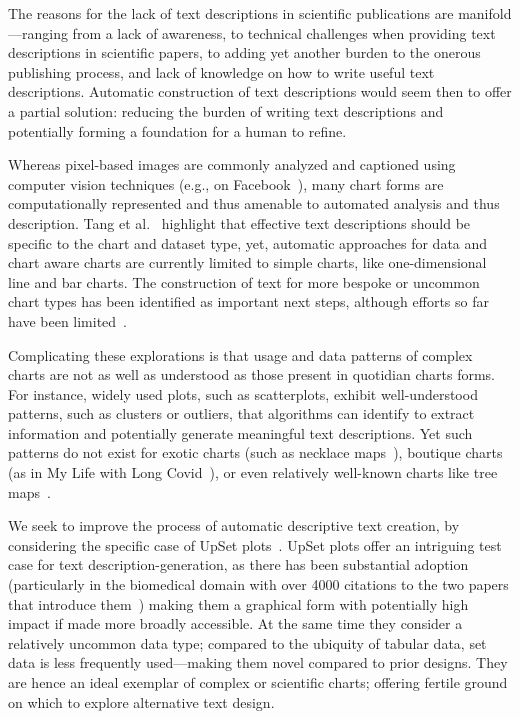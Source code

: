 \documentclass{egpubl}
\newcommand{\etal}{et al.}
\newcommand{\eg}{{e.g.,}}
\begin{document}
The reasons for the lack of text descriptions in scientific publications are manifold---ranging from a lack of awareness, to technical challenges when providing text descriptions in scientific papers, to adding yet another burden to the onerous publishing process, and lack of knowledge on how to write useful text descriptions.
Automatic construction of text descriptions would seem then to offer a partial solution: reducing the burden of writing text descriptions and potentially forming a foundation for a human to refine.

Whereas pixel-based images are commonly analyzed and captioned using computer vision techniques (\eg{} on Facebook~\cite{wu_automatic_2017}), many chart forms are computationally represented and thus amenable to automated analysis and thus description.
Tang \etal{}~\cite{tang_vistext_2023} highlight that effective text descriptions should be specific to the chart and dataset type, yet, automatic approaches for data and chart aware charts are currently limited to simple charts, like one-dimensional line and bar charts. The construction of text for more bespoke or uncommon chart types has been identified as important next steps, although efforts so far have been limited~\cite{kim_explain_2023, li_altgeoviz_2024}.

Complicating these explorations is that usage and data patterns of complex charts are not as well as understood as those present in quotidian charts forms.
For instance, widely used plots, such as scatterplots, exhibit well-understood patterns, such as clusters or outliers, that algorithms can identify to extract information and potentially generate meaningful text descriptions.
Yet such patterns do not exist for exotic charts (such as necklace maps~\cite{speckmann_necklace_2010}), boutique charts (as in My Life with Long Covid~\cite{luipi_opinion_2023}), or even relatively well-known charts like tree maps~\cite{kim_explain_2023}.

We seek to improve the process of automatic descriptive text creation, by considering the specific case of UpSet plots~\cite{lex_upset_2014}.
UpSet plots offer an intriguing test case for text description-generation, as there has been substantial adoption (particularly in the biomedical domain with over 4000 citations to the two papers that introduce them~\cite{lex_upset_2014, conway_upsetr_2017}) making them a graphical form with potentially high impact if made more broadly accessible.
At the same time they consider a relatively uncommon data type; compared to the ubiquity of tabular data, set data is less frequently used---making them novel compared to prior designs.
They are hence an ideal exemplar of complex or scientific charts; offering fertile ground on which to explore alternative text design.
\end{document}
